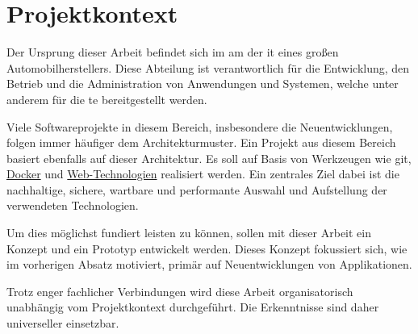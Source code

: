 \section{Projektkontext}
\label{sec:01-02_project-context}

Der Ursprung dieser Arbeit befindet sich im \Gls{am} der \acrshort{it} eines großen Automobilherstellers. Diese Abteilung ist verantwortlich für die Entwicklung, den Betrieb und die Administration von Anwendungen und Systemen, welche unter anderem für die \acrshort{te} bereitgestellt werden.

Viele Softwareprojekte in diesem Bereich, insbesondere die Neuentwicklungen, folgen immer häufiger dem  Architekturmuster. Ein Projekt aus diesem Bereich basiert ebenfalls auf dieser Architektur. Es soll auf Basis von Werkzeugen wie \Gls{git}, \hyperref[sec:02-03_containerization]{Docker} und \hyperref[sec:02-01_web-development]{Web-Technologien} realisiert werden. Ein zentrales Ziel dabei ist die nachhaltige, sichere, wartbare und performante Auswahl und Aufstellung der verwendeten Technologien.

Um dies möglichst fundiert leisten zu können, sollen mit dieser Arbeit ein Konzept und ein Prototyp entwickelt werden. Dieses Konzept fokussiert sich, wie im vorherigen Absatz motiviert, primär auf Neuentwicklungen von Applikationen.

Trotz enger fachlicher Verbindungen wird diese Arbeit organisatorisch unabhängig vom Projektkontext durchgeführt. Die Erkenntnisse sind daher universeller einsetzbar.

